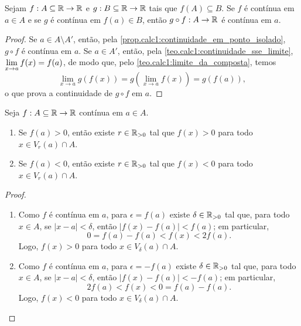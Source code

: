 \begin{theorem}
    Sejam $f : A \subseteq \mathbb{R} \to \mathbb{R}$ e $g : B \subseteq \mathbb{R} \to \mathbb{R}$ tais que $f(A) \subseteq B$. Se $f$ é contínua em $a \in A$ e se $g$ é contínua em $f(a) \in B$, então $g \circ f : A \to \mathbb{R}$ é contínua em $a$.    
\end{theorem}

\begin{proof}
    Se $a \in A \setminus A'$, então, pela \cref{prop.calc1:continuidade_em_ponto_isolado}, $g \circ f$ é contínua em $a$. Se $a \in A'$, então, pela \cref{teo.calc1:continuidade_sse_limite}, $\displaystyle \lim_{x \to a} f(x) = f(a)$, de modo que, pelo \cref{teo.calc1:limite_da_composta}, temos
        \[
            \lim_{x \to a} g(f(x)) = g \left(\lim_{x \to a} f(x) \right) = g(f(a)),
        \]
    o que prova a continuidade de $g \circ f$ em $a$. \blackproof
\end{proof}

\begin{proposition} \label{prop.calc1:con_sin_cont}
    Seja $f : A \subseteq \mathbb{R} \to \mathbb{R}$ contínua em $a \in A$.
        \begin{enumerate}[leftmargin=*, align=left, label=\textbf{(\alph*)}]
            \item Se $f(a) > 0$, então existe $r \in \mathbb{R}_{>0}$ tal que $f(x) > 0$ para todo $x \in V_{r}(a) \cap A$.
            \item Se $f(a) < 0$, então existe $r \in \mathbb{R}_{>0}$ tal que $f(x) < 0$ para todo $x \in V_{r}(a) \cap A$.
        \end{enumerate}
\end{proposition}

\begin{proof}
    \leavevmode
        \begin{enumerate}[leftmargin=*, align=left, label=\textbf{(\alph*)}]
            \item Como $f$ é contínua em $a$, para $\epsilon = f(a)$ existe $\delta \in \mathbb{R}_{>0}$ tal que, para todo $x \in A$, se $|x-a|<\delta$, então $|f(x) - f(a)| < f(a)$; em particular,
                \[
                    0 = f(a) - f(a) < f(x) < 2f(a).
                \]
            Logo, $f(x) > 0$ para todo $x \in V_{\delta}(a) \cap A$. \blackproof
            \item Como $f$ é contínua em $a$, para $\epsilon = -f(a)$ existe $\delta \in \mathbb{R}_{>0}$ tal que, para todo $x \in A$, se $|x-a|<\delta$, então $|f(x) - f(a)| < -f(a)$; em particular,
                \[
                    2f(a) < f(x) < 0 = f(a) - f(a).
                \]
            Logo, $f(x) < 0$ para todo $x \in V_{\delta}(a) \cap A$. \blackproof
        \end{enumerate}
\end{proof}

